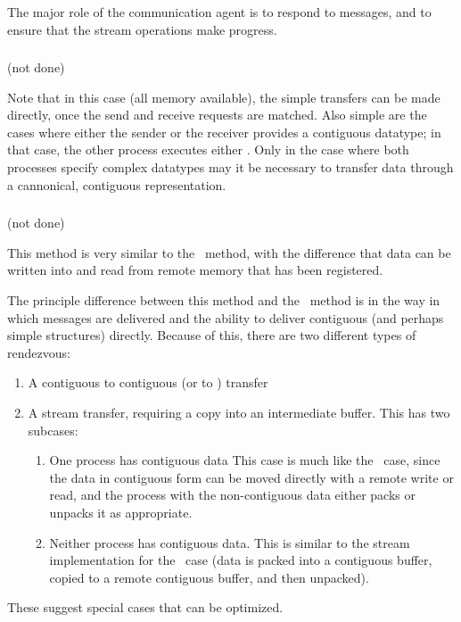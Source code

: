 
The major role of the communication agent is to respond to messages, and to
ensure that the stream operations make progress.

\subsubsection{\shmemallname}
(not done)

Note that in this case (all memory available), the simple transfers can be
made directly, once the send and receive requests are matched.  Also simple
are the cases where either the sender or the receiver provides a contiguous
datatype; in that case, the other process executes either
 .  Only in the case where both
processes specify complex datatypes may it be necessary to transfer data
through a cannonical, contiguous representation.

\subsubsection{\vianame}
(not done)

This method is very similar to the \tcpname\ method, with the difference that
data can be written into and read from remote memory that has been registered.

The principle difference between this method and the \tcpname\ method is in
the way in which messages are delivered and the ability to deliver contiguous
(and perhaps simple  structures) directly.  Because of this, there
are two different types of rendezvous:
\begin{enumerate}
\item A contiguous to contiguous (or  to ) transfer
\item A stream transfer, requiring a copy into an intermediate buffer.
  This has two subcases:
  \begin{enumerate}
  \item One process has contiguous data
  This case is much like the \shmemname\ case, since the data in contiguous
  form can be moved directly with a remote write or read, and the process with
  the non-contiguous data either packs or unpacks it as appropriate.
  \item Neither process has contiguous data.  This is similar to the
  stream implementation for the \tcpname\ case (data is packed into a
  contiguous buffer, copied to a remote contiguous buffer, and then unpacked).
  \end{enumerate}
\end{enumerate}
These suggest special cases that can be optimized.

